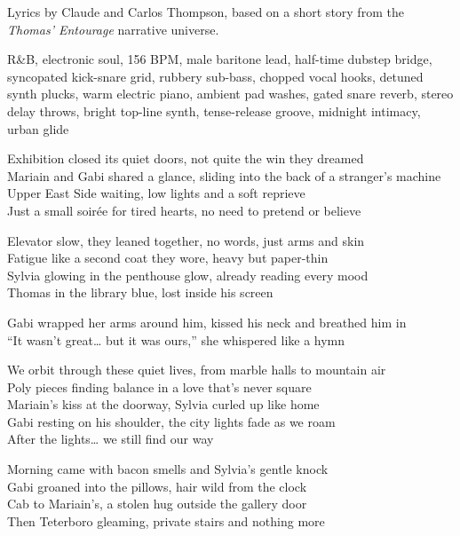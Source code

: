 
\begin{notes}
Lyrics by Claude and Carlos Thompson, based on a short story from the \emph{Thomas’ Entourage} narrative universe.
\end{notes}
\begin{style}
R\&B, electronic soul, 156 BPM, male baritone lead, half-time dubstep bridge, syncopated kick-snare grid, rubbery sub-bass, chopped vocal hooks, detuned synth plucks, warm electric piano, ambient pad washes, gated snare reverb, stereo delay throws, bright top-line synth, tense-release groove, midnight intimacy, urban glide
\end{style}
\begin{lyrics}
Exhibition closed its quiet doors, not quite the win they dreamed\\
Mariain and Gabi shared a glance, sliding into the back of a stranger’s machine\\
Upper East Side waiting, low lights and a soft reprieve\\
Just a small soirée for tired hearts, no need to pretend or believe

Elevator slow, they leaned together, no words, just arms and skin\\
Fatigue like a second coat they wore, heavy but paper-thin\\
Sylvia glowing in the penthouse glow, already reading every mood\\
Thomas in the library blue, lost inside his screen

Gabi wrapped her arms around him, kissed his neck and breathed him in\\
“It wasn’t great… but it was ours,” she whispered like a hymn

We orbit through these quiet lives, from marble halls to mountain air\\
Poly pieces finding balance in a love that’s never square\\
Mariain’s kiss at the doorway, Sylvia curled up like home\\
Gabi resting on his shoulder, the city lights fade as we roam\\
After the lights… we still find our way

Morning came with bacon smells and Sylvia’s gentle knock\\
Gabi groaned into the pillows, hair wild from the clock\\
Cab to Mariain’s, a stolen hug outside the gallery door\\
Then Teterboro gleaming, private stairs and nothing more


\end{lyrics}
